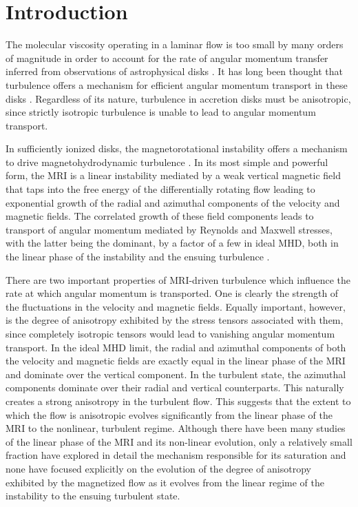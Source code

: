 \documentclass[]{emulateapj}
\begin{document}
\section{Introduction}



The molecular viscosity operating in a laminar flow is too small by many
orders of magnitude in order to account for the rate of angular
momentum transfer inferred from observations of astrophysical disks
\citep{2002apa..book.....F}. It has long been thought that turbulence
offers a mechanism for efficient angular momentum transport in these
disks \citep{Shakura:1973uy,LyndenBell:1974uq}. 
Regardless of its nature,
turbulence in accretion disks must be anisotropic, since strictly isotropic 
turbulence is unable to lead to angular momentum transport.

In sufficiently ionized disks, the magnetorotational instability
\citep[MRI; ][]{1991ApJ...376..214B} offers a mechanism to drive
magnetohydrodynamic turbulence
\citep{Hawley:1995gd,Brandenburg:1996du}.  In its most simple and
powerful form, the MRI is a linear instability mediated by a weak
vertical magnetic field that taps into the free energy of the
differentially rotating flow leading to exponential growth of the
radial and azimuthal components of the velocity and magnetic fields.
The correlated growth of these field components leads to transport of
angular momentum mediated by Reynolds and Maxwell stresses, with the
latter being the dominant, by a factor of a few  in ideal MHD, both in the linear
phase of the instability and the ensuing turbulence 
\citep{2006MNRAS.372..183P}.

There are two important properties of MRI-driven turbulence which influence
 the rate at which angular momentum is transported. One
is clearly the strength of the fluctuations in the velocity and
magnetic fields.  Equally important, however, is the degree of
anisotropy exhibited by the stress tensors associated with them, since completely 
isotropic tensors would lead to vanishing angular momentum transport.  
In the ideal MHD limit, the radial and azimuthal components of both the 
velocity and magnetic fields are exactly equal in the linear phase of 
the MRI and dominate over the vertical component. In the turbulent state,
the azimuthal components dominate over their radial and vertical
counterparts. This naturally creates a strong anisotropy in the
turbulent flow. This suggests that the extent to which the flow is
anisotropic evolves significantly from the linear phase of the MRI to
the nonlinear, turbulent regime.  Although there have been many studies of the
linear phase of the MRI and its non-linear evolution, only a
relatively small fraction have explored in detail the mechanism
responsible for its saturation and none have focused explicitly on the
evolution of the degree of anisotropy exhibited by the magnetized flow as it 
evolves from the linear regime of the instability to the ensuing turbulent state.
\end{document}
